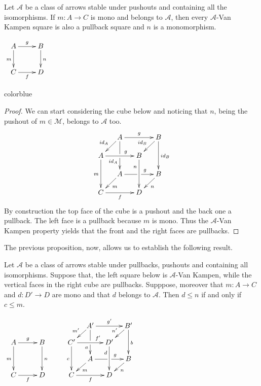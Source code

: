 \documentclass[a4paper,UKenglish,cleveref,pdftex, thm-restate,numberwithinsect,anonymous]{lipics}
\newcommand{\full}[1]{{color{blue}#1}}
\newcommand{\full}[1]{}
\newcommand{\id}[1]{\mathsf{id}_{#1}}
\def\C{\textbf {\textup{C}}}
\begin{document}
\noindent 
\parbox{11.5cm}{\begin{proposition}\label{prop:pbpo} Let $\mathcal{A}$ be a class of arrows stable under pushouts and containing all the isomorphisms.  If $m\colon A\to C$ is mono and belongs to $\mathcal{A}$, then every $\mathcal{A}$-Van Kampen square
	is also a pullback square and $n$ is a monomorphism.
\end{proposition}}
\parbox{2cm}{\vspace{1.5ex}$\xymatrix{A\ar[r]^{g} \ar[d]_{m} & B \ar[d]^{n} \\ C \ar[r]_{f}  & D}$}

\full{ 
\begin{proof}
	We can start considering the cube below and noticing that $n$, being the pushout of $m\in \mathcal{M}$, belongs to $\mathcal{A}$ too.
	\[\xymatrix@C=13pt@R=13pt{&A\ar[dd]|\hole_(.65){\id{A}}\ar[rr]^{g} \ar[dl]_{\id{A}} && B \ar[dd]^{\id{B}} \ar[dl]_{\id{B}} \\ A  \ar[dd]_{m}\ar[rr]^(.65){g} & & B \ar[dd]_(.3){n}\\&A\ar[rr]|\hole^(.65){g} \ar[dl]^{m} && B \ar[dl]^{n} \\C \ar[rr]_{f} & & D}\]
	By construction the top face of the cube is a pushout and the back one a pullback. The left face is a pullback because $m$ is mono. Thus the $\mathcal{A}$-Van Kampen property yields that the front and the right faces are pullbacks.
\end{proof}}

The previous proposition, now, allows us to establish the following result.

\noindent \parbox{7.4cm}{
\begin{lemma}\label{lem:varie}Let $\mathcal{A}$ be a class of arrows stable under pullbacks, pushouts and containing all isomorphisms.  Suppose that, the left square below is $\mathcal{A}$-Van Kampen, while the vertical faces in the right cube are pullbacks. 	Supppose, moreover that $m\colon A\to C$ and $d\colon D'\to D$ are mono and that $d$ belongs to $\mathcal{A}$. Then $d\leq n$ if and only if $c \leq m$.
\end{lemma}}
	\parbox{6cm}{$\xymatrix@C=10pt@R=10pt{&&&&&A'\ar[dd]|\hole_(.65){a}\ar[rr]^{g'} \ar[dl]_{m'} && B' \ar[dd]^{b} \ar[dl]_{n'} \\ A \ar[dd]_{m}\ar[rr]^{g}&&B\ar[dd]^{n}&&C'  \ar[dd]_{c}\ar[rr]^(.7){f'} & & D' \ar[dd]_(.3){d}\\&&&&&A\ar[rr]|\hole^(.65){g} \ar[dl]^{m} && B \ar[dl]^{n} \\C\ar[rr]_{f} &&D&&C \ar[rr]_{f} & & D}$}
\end{document}
